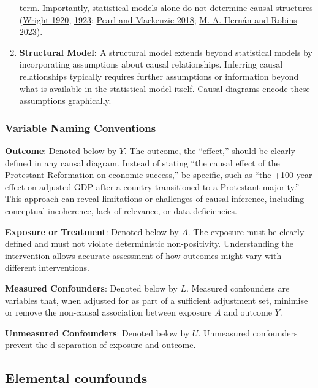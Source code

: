 \documentclass[
  singlecolumn]{report}
\begin{document}
\begin{enumerate}
  term. Importantly, statistical models alone do not determine causal
  structures (\protect\hyperlink{ref-wright1920}{Wright 1920},
  \protect\hyperlink{ref-wright1923}{1923};
  \protect\hyperlink{ref-pearl2018}{Pearl and Mackenzie 2018};
  \protect\hyperlink{ref-hernuxe1n2023a}{M. A. Hernán and Robins 2023}).
\item
  \textbf{Structural Model:} A structural model extends beyond
  statistical models by incorporating assumptions about causal
  relationships. Inferring causal relationships typically requires
  further assumptions or information beyond what is available in the
  statistical model itself. Causal diagrams encode these assumptions
  graphically.
\end{enumerate}

\hypertarget{variable-naming-conventions}{%
\subsubsection{Variable Naming
Conventions}\label{variable-naming-conventions}}

\textbf{Outcome}: Denoted below by \(Y\). The outcome, the ``effect,''
should be clearly defined in any causal diagram. Instead of stating
``the causal effect of the Protestant Reformation on economic success,''
be specific, such as ``the +100 year effect on adjusted GDP after a
country transitioned to a Protestant majority.'' This approach can
reveal limitations or challenges of causal inference, including
conceptual incoherence, lack of relevance, or data deficiencies.

\textbf{Exposure or Treatment}: Denoted below by \(A\). The exposure
must be clearly defined and must not violate deterministic
non-positivity. Understanding the intervention allows accurate
assessment of how outcomes might vary with different interventions.

\textbf{Measured Confounders}: Denoted below by \(L\). Measured
confounders are variables that, when adjusted for as part of a
sufficient adjustment set, minimise or remove the non-causal association
between exposure \(A\) and outcome \(Y\).

\textbf{Unmeasured Confounders}: Denoted below by \(U\). Unmeasured
confounders prevent the d-separation of exposure and outcome.

\hypertarget{elemental-counfounds}{%
\subsection{Elemental counfounds}\label{elemental-counfounds}}
\end{document}
